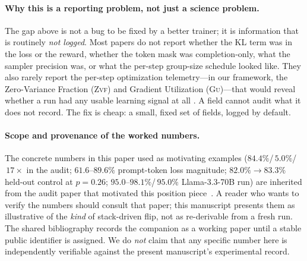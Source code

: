 \documentclass[11pt]{article}
\newcommand{\zvf}{\textsc{Zvf}}
\newcommand{\gu}{\textsc{Gu}}
\begin{document}
\paragraph{Why this is a reporting problem, not just a science problem.}
The gap above is not a bug to be fixed by a better trainer; it is information
that is routinely \emph{not logged}. Most papers do not report whether the KL
term was in the loss or the reward, whether the token mask was completion-only,
what the sampler precision was, or what the per-step group-size schedule looked
like. They also rarely report the per-step optimization telemetry---in our
framework, the Zero-Variance Fraction (\zvf{}) and Gradient Utilization
(\gu{})---that would reveal whether a run had any usable learning signal at all
\cite{zvfaudit2026}. A field cannot audit what it does not record. The fix is
cheap: a small, fixed set of fields, logged by default.

\paragraph{Scope and provenance of the worked numbers.}
The concrete numbers in this paper used as motivating examples
($84.4\%$/$\,5.0\%$/$\,17\times$ in the audit;
$61.6$--$89.6\%$ prompt-token loss magnitude;
$82.0\%\to83.3\%$ held-out control at $p=0.26$;
$95.0$--$98.1\%$/$\,95.0\%$ Llama-3.3-70B run)
are inherited from the audit paper that motivated this
position piece~\citep{zvfaudit2026}. A reader who wants to verify the numbers should consult that
paper; this manuscript presents them as illustrative of the
\emph{kind} of stack-driven flip, not as re-derivable from a fresh
run. The shared bibliography records the companion as a working paper until a
stable public identifier is assigned.
We do \emph{not} claim that any specific number here is independently
verifiable against the present manuscript's experimental record.
\end{document}
